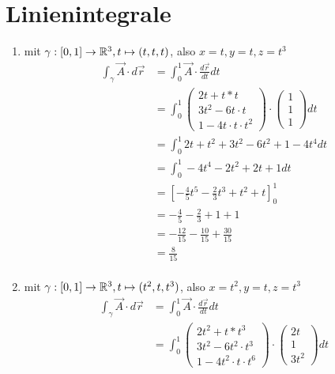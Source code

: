 \documentclass[sectionformat=aufgabe]{gadsescript}
\begin{document}
\section{Linienintegrale}
\begin{enumerate}[label=\alph*)]
	\item mit $ \gamma : [0, 1] \to \mathbb{R}^3, t \mapsto (t, t, t) $, also $ x = t, y = t, z = t^3 $
		\begin{align*}
			\int_{\gamma} \vec A \cdot d\vec r &= \int_{0}^{1} \vec A \cdot \frac{d\vec r}{ dt } dt\\
			~&= \int_{0}^{1} \begin{pmatrix} 2t + t * t\\ 3 t^2 - 6 t \cdot t\\ 1 - 4 t \cdot t \cdot t^2 \end{pmatrix}  \cdot \begin{pmatrix} 1\\1\\1 \end{pmatrix} dt \\
			~&= \int_{0}^{1} 2t + t^2 + 3 t^2 - 6 t^2 + 1 - 4 t^4  dt \\
			~&= \int_{0}^{1} - 4 t^4 - 2t^2 + 2 t + 1 dt \\
			~&= \left[ - \frac{ 4 }{ 5 }  t^5 - \frac{ 2 }{ 3 } t^3 + t^2 + t\right]_0^1 \\
			~&= - \frac{ 4 }{ 5 } - \frac{ 2 }{ 3 } + 1 + 1 \\
			~&= - \frac{ 12 }{ 15 } - \frac{ 10 }{ 15 } + \frac{ 30 }{ 15 }  \\
			~&= \frac{ 8 }{ 15 } \\
		\end{align*}
	\item mit $ \gamma : [0, 1] \to \mathbb{R}^3, t \mapsto (t^2, t, t^3) $, also $ x = t^2, y = t, z = t^3 $
		\begin{align*}
			\int_{\gamma} \vec A \cdot d\vec r &= \int_{0}^{1} \vec A \cdot \frac{d\vec r}{ dt } dt\\
			~&= \int_{0}^{1} \begin{pmatrix} 2t^2 + t * t^3\\ 3 t^2 - 6 t^2 \cdot t^3\\ 1 - 4 t^2 \cdot t \cdot t^6 \end{pmatrix}  \cdot \begin{pmatrix} 2t\\1\\3t^2 \end{pmatrix} dt \\

\end{align*}
\end{enumerate}
\end{document}
